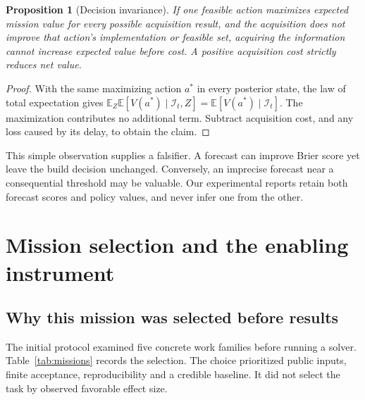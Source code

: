 \documentclass[11pt,a4paper]{article}
\newtheorem{proposition}{Proposition}
\begin{document}
\begin{proposition}[Decision invariance]
If one feasible action maximizes expected mission value for every possible acquisition result, and the acquisition does not improve that action's implementation or feasible set, acquiring the information cannot increase expected value before cost. A positive acquisition cost strictly reduces net value.
\end{proposition}
\begin{proof}
With the same maximizing action $a^*$ in every posterior state, the law of total expectation gives $\mathbb E_Z\mathbb E[V(a^*)\mid\mathcal I_t,Z]=\mathbb E[V(a^*)\mid\mathcal I_t]$. The maximization contributes no additional term. Subtract acquisition cost, and any loss caused by its delay, to obtain the claim.
\end{proof}

This simple observation supplies a falsifier. A forecast can improve Brier score yet leave the build decision unchanged. Conversely, an imprecise forecast near a consequential threshold may be valuable. Our experimental reports retain both forecast scores and policy values, and never infer one from the other.

\section{Mission selection and the enabling instrument}
\subsection{Why this mission was selected before results}
The initial protocol examined five concrete work families before running a solver. Table~\ref{tab:missions} records the selection. The choice prioritized public inputs, finite acceptance, reproducibility and a credible baseline. It did not select the task by observed favorable effect size.
\end{document}
